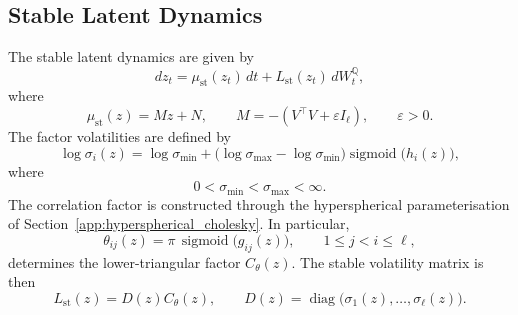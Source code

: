 \subsection{Stable Latent Dynamics}
\label{app:stable_sde_wellposed}

The stable latent dynamics are given by
\begin{equation}
    dz_t
    =
    \mu_{\mathrm{st}}(z_t)\,dt
    +
    L_{\mathrm{st}}(z_t)\,dW_t^{\mathbb Q},
    \label{eq:app_stable_sde}
\end{equation}
where
\[
    \mu_{\mathrm{st}}(z)
    =
    Mz+N,
    \qquad
    M=-(V^\top V+\varepsilon I_\ell),
    \qquad
    \varepsilon>0.
\]
The factor volatilities are defined by
\[
    \log \sigma_i(z)
    =
    \log \sigma_{\min}
    +
    \bigl(
        \log \sigma_{\max}
        -
        \log \sigma_{\min}
    \bigr)
    \operatorname{sigmoid}\bigl(h_i(z)\bigr),
\]
where
\[
    0<\sigma_{\min}<\sigma_{\max}<\infty.
\]
The correlation factor is constructed through the hyperspherical parameterisation of Section~\ref{app:hyperspherical_cholesky}. In particular,
\[
    \theta_{ij}(z)
    =
    \pi\,\operatorname{sigmoid}\bigl(g_{ij}(z)\bigr),
    \qquad
    1\leq j<i\leq\ell,
\]
determines the lower-triangular factor \(C_\theta(z)\). The stable volatility matrix is then
\[
    L_{\mathrm{st}}(z)
    =
    D(z)C_\theta(z),
    \qquad
    D(z)
    =
    \operatorname{diag}
    \bigl(\sigma_1(z),\ldots,\sigma_\ell(z)\bigr).
\]


